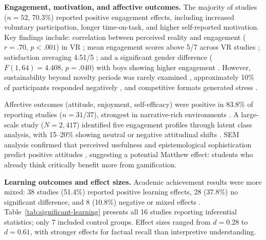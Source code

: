 \textbf{Engagement, motivation, and affective outcomes.}
The majority of studies ($n = 52$, 70.3\%) reported positive engagement effects, including increased voluntary participation, longer time-on-task, and higher self-reported motivation. Key findings include: correlation between perceived reality and engagement ($r = .70$, $p < .001$) in VR \cite{1Barbatsis201159}; mean engagement scores above 5/7 across VR studies \cite{10Huaman2019220, 31DeAmicis2009451}; satisfaction averaging 4.51/5 \cite{64Hsu201324}; and a significant gender difference ($F(1,64) = 4.408$, $p = .040$) with boys showing higher engagement \cite{49Huizenga2007127}. However, sustainability beyond novelty periods was rarely examined \cite{DichevDicheva2017, Hamari2014}, approximately 10\% of participants responded negatively \cite{47Clara2010156}, and competitive formats generated stress \cite{11Ternblad2023115}.

Affective outcomes (attitude, enjoyment, self-efficacy) were positive in 83.8\% of reporting studies ($n = 31/37$), strongest in narrative-rich environments \cite{12Gilbert2019108, 74Fendt2019, 29Stiso20201165}. A large-scale study ($N = 2{,}417$) identified five engagement profiles through latent class analysis, with 15--20\% showing neutral or negative attitudinal shifts \cite{15Slater2022}. SEM analysis confirmed that perceived usefulness and epistemological sophistication predict positive attitudes \cite{45Yu2015727}, suggesting a potential Matthew effect: students who already think critically benefit more from gamification.

\textbf{Learning outcomes and effect sizes.}
Academic achievement results were more mixed: 38 studies (51.4\%) reported positive learning effects, 28 (37.8\%) no significant difference, and 8 (10.8\%) negative or mixed effects \cite{KorniienkoSemerikov2024, 47Clara2010156, Oceja2022419}. Table~\ref{tab:significant-learning} presents all 16 studies reporting inferential statistics; only 7 included control groups. Effect sizes ranged from $d = 0.28$ to $d = 0.61$, with stronger effects for factual recall than interpretive understanding.

